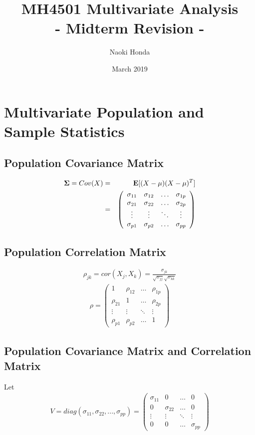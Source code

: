 \documentclass[12pt]{extarticle}
\title{\textbf{MH4501 Multivariate Analysis}\\
\Large - Midterm Revision -}
\author{Naoki Honda}
\date{March 2019}
\newcommand{\<}{\langle}
\renewcommand{\>}{\rangle}
\theoremstyle{definition}
\begin{document}
\maketitle

\section{Multivariate Population and Sample Statistics}
\subsection{Population Covariance Matrix}
\begin{eqnarray*}
{\bf \Sigma} = Cov(X) &=& {\bf E}[(X-\mu)(X-\mu)^T]\\
&=& \left(
    \begin{array}{cccc}
      \sigma_{11} & \sigma_{12} & \ldots & \sigma_{1p} \\
      \sigma_{21} & \sigma_{22} & \ldots & \sigma_{2p} \\
      \vdots & \vdots & \ddots & \vdots \\
      \sigma_{p1} & \sigma_{p2} & \ldots & \sigma_{pp}
    \end{array} \right)
\end{eqnarray*} 

\subsection{Population Correlation Matrix}
\begin{eqnarray*}
\rho_{jk} = cor(X_j, X_k) = \frac{\sigma_{jk}}{\sqrt{\sigma_{jj}}\sqrt{\sigma_{kk}}}
\end{eqnarray*}
\begin{eqnarray*}
\rho = \left(
    \begin{array}{cccc}
      1 & \rho_{12} & \ldots & \rho_{1p} \\
      \rho_{21} & 1 & \ldots & \rho_{2p} \\
      \vdots & \vdots & \ddots & \vdots \\
      \rho_{p1} & \rho_{p2} & \ldots & 1
    \end{array} \right)
\end{eqnarray*}

\newpage
\subsection{Population Covariance Matrix and Correlation Matrix}
Let
\begin{eqnarray*}
V = diag(\sigma_{11}, \sigma_{22}, ... , \sigma_{pp}) = \left(
    \begin{array}{cccc}
      \sigma_{11} & 0 & \ldots & 0 \\
      0 & \sigma_{22} & \ldots & 0 \\
      \vdots & \vdots & \ddots & \vdots \\
      0 & 0 & \ldots & \sigma_{pp}
    \end{array} \right) 
\end{eqnarray*}
\end{document}
